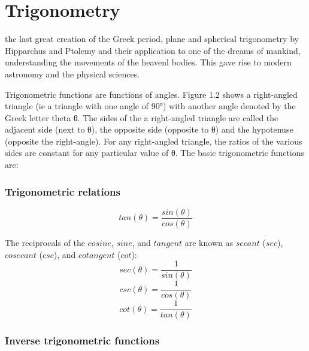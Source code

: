 \chapter{Trigonometry}

the  last  great  creation  of  the  Greek  period,  plane  and 
 spherical  trigonometry  by  Hipparchus  and  Ptolemy  and  their  application  to
 one  of  the  dreams  of  mankind,  understanding  the  movements  of  the  heavenl bodies.  This  gave  rise  to  modern  astronomy  and  the  physical  sciences.



Trigonometric functions are functions of angles. Figure 1.2 shows a right-angled
triangle (ie a triangle with one angle of 90°) with another angle denoted by
the Greek letter theta θ. The sides of the a right-angled triangle are called
the adjacent side (next to θ), the opposite side (opposite to θ) and the
hypotenuse (opposite the right-angle). For any right-angled triangle, the
ratios of the various sides are constant for any particular value of θ. The
basic trigonometric functions are:

\subsection{Trigonometric relations}
\begin{equation}
    tan(\theta) = \frac{sin(\theta)}{cos(\theta)}
\end{equation}

The reciprocals of the $cosine$, $sine$, and $tangent$ are known as
$secant$ ($sec$), $cosecant$ ($csc$), and $cotangent$ ($cot$):
\begin{equation}
    sec(\theta) = \frac{1}{sin(\theta)}
\end{equation}
\begin{equation}
    csc(\theta) = \frac{1}{cos(\theta)}
\end{equation}
\begin{equation}
    cot(\theta) = \frac{1}{tan(\theta)}
\end{equation}

\subsection{Inverse trigonometric functions}
